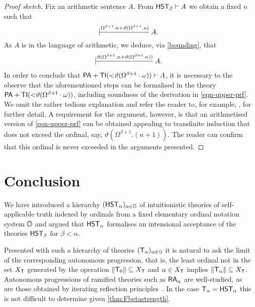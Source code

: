 \documentclass[UKenglish,cleveref,DIV=12]{scrartcl}
\theoremstyle{definition}
\theoremstyle{definition}
\begin{document}
\begin{proof}[Proof sketch]
	Fix an arithmetic sentence \( A \).
	From \( \mathsf{HST}_\beta \vdash A \) we obtain a fixed \( n \) such that 
	\[ 
		\prov{\Omega^{\beta+1}.n + \vartheta(\Omega^{\beta+1}.n ) } A .
	\] %
	As \( A \) is in the language of arithmetic, we deduce, via \cref{bounding}, that
	\begin{gather}
		\prov{\vartheta(\Omega^{\beta+1}.n + \vartheta(\Omega^{\beta+1}.n) )} A.
		\label{eqn-upper-prf}
	\end{gather}
	In order to conclude that $\mathsf{PA} + \mathsf{TI}({<}\vartheta(\Omega^{\beta+1}\cdot\omega)) \vdash A$, it is necessary to the observe that the aforementioned steps can be formalised in the theory \( \mathsf{PA} + \mathsf{TI}({<}\vartheta(\Omega^{\beta+1}\cdot\omega)) \), including  soundness of the derivation in \eqref{eqn-upper-prf}.
	We omit the rather tedious explanation and refer the reader to, for example, \cite{LeiRat10}, for further detail.
	A requirement for the argument, however, is that an arithmetised version of \eqref{eqn-upper-prf} can be obtained appealing to transfinite induction that does not exceed the ordinal, say, \( \vartheta(\Omega^{\beta+1}.(n + 1) ) \). 
	The reader can confirm that this ordinal is never exceeded in the arguments presented.
\end{proof}

\section{Conclusion}\label{sec:conc}

We have introduced a hierarchy  \( ( \mathsf{HST}_\alpha )_{\alpha \in \mathbb{O} } \) of intuitionistic theories of self-applicable truth indexed by ordinals from a fixed elementary ordinal notation system \( \mathbb{O} \) and argued that \( \mathsf{HST}_{\alpha} \) formalises an intensional acceptance of the theories \( \mathsf{HST}_{\beta} \) for \( \beta < \alpha \).

Presented with such a hierarchy of theories $ ( \mathsf{T}_\alpha )_{\alpha\in\mathbb{O} }$ it is natural to ask the limit of the corresponding
autonomous progression, that is, the least ordinal not in the set $X_{\mathsf{T}}$ generated by the operation $\lVert{\mathsf{T}_0}\rVert\subseteq X_{\mathsf{T}}$ and
$\alpha\in X_{\mathsf{T}}$ implies $\lVert{\mathsf{T}_\alpha}\rVert\subseteq X_{\mathsf{T}}$. 
Autonomous progressions of ramified theories such as $\mathsf{RA}_\alpha$ are well-studied, as are those obtained by
iterating reflection principles~\cite{XX}.
In the case $\mathsf{T}_\alpha=\mathsf{HST}_\alpha$ this is not difficult to determine
given \cref{thm:Fbetastrength}.
\end{document}

